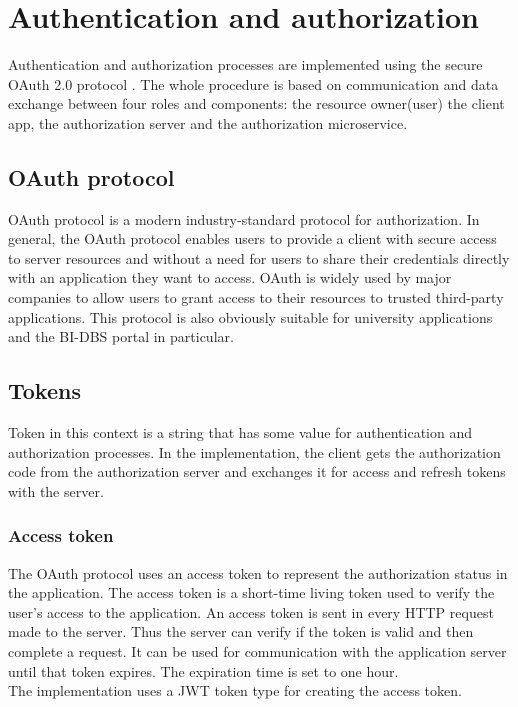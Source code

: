 \section{Authentication and authorization}
Authentication and authorization processes are implemented using the secure OAuth 2.0 protocol \cite{oauth}. The whole procedure is based on communication and data exchange between four roles and components: the resource owner(user) the client app, the authorization server and the authorization microservice.

\subsection{OAuth protocol}
OAuth protocol is a modern industry-standard protocol for authorization. 
In general, the OAuth protocol enables users to provide a client with secure access to server resources and without a need for users to share their credentials directly with an application they want to access. OAuth is widely used by major companies to allow users to grant access to their resources to trusted third-party applications. \cite{oauth} This protocol is also obviously suitable for university applications and the BI-DBS portal in particular.

\subsection{Tokens} Token in this context is a string that has some value for authentication and authorization processes. In the implementation, the client gets the authorization code from the authorization server and exchanges it for access and refresh tokens with the server. 

\subsubsection{Access token}
The OAuth protocol uses an access token to represent the authorization status in the application. The access token is a short-time living token used to verify the user's access to the application. \cite{access-token} An access token is sent in every HTTP request made to the server. Thus the server can verify if the token is valid and then complete a request. It can be used for communication with the application server until that token expires. The expiration time is set to one hour. \\ 
The implementation uses a JWT token type for creating the access token. 
 
